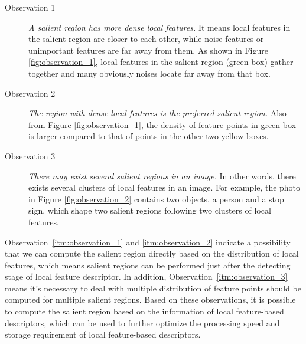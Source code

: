 \begin{description}
	
\item[Observation 1]  \textit{A salient region has more dense local features.} It means local features in the salient region are closer to each other, while noise features or unimportant features are far away from them. As shown in Figure \ref{fig:observation_1}, local features in the salient region (green box) gather together and many obviously noises locate far away from that box. 

\item[Observation 2]  \textit{The region with dense  local features is the preferred salient region.} Also from Figure \ref{fig:observation_1}, the density of feature points in green box is larger compared to that of points in the other two yellow boxes. 

\item[Observation 3]  \textit{There may exist several salient regions in an image.} In other words, there exists several clusters of local features in an image. For example, the photo in Figure \ref{fig:observation_2} contains two objects, a person and a stop sign, which shape two salient regions following two clusters of local features.

\end{description}

Observation~\ref{itm:observation_1} and \ref{itm:observation_2} indicate a possibility that we can compute the salient region directly based on the distribution of local features, which means salient regions can be performed just after the detecting stage of local feature descriptor. In addition, Observation~\ref{itm:observation_3} means it's necessary to deal with multiple distribution of feature points should be computed for multiple salient regions. Based on these observations, it is possible to compute the salient region based on the information of local feature-based descriptors, which can be used to further optimize the processing speed and storage requirement of local feature-based descriptors.